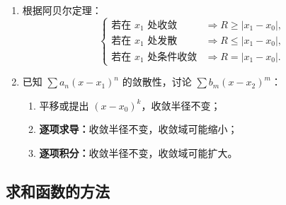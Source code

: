 \begin{enumerate}
\begin{enumerate}
              \item 根据阿贝尔定理：
                    \[
                        \begin{cases}
                            \text{若在 } x_1 \text{ 处收敛}   & \Rightarrow R \ge |x_1 - x_0|, \\
                            \text{若在 } x_1 \text{ 处发散}   & \Rightarrow R \le |x_1 - x_0|, \\
                            \text{若在 } x_1 \text{ 处条件收敛} & \Rightarrow R = |x_1 - x_0|.
                        \end{cases}
                    \]

              \item 已知 $\sum a_n (x-x_1)^n$ 的敛散性，讨论 $\sum b_m (x-x_2)^m$：
                    \begin{enumerate}
                        \item 平移或提出 $(x-x_0)^k$，收敛半径不变；
                        \item \textbf{逐项求导：}收敛半径不变，收敛域可能缩小；
                        \item \textbf{逐项积分：}收敛半径不变，收敛域可能扩大。
                    \end{enumerate}
          \end{enumerate}
\end{enumerate}

\subsection{求和函数的方法}

